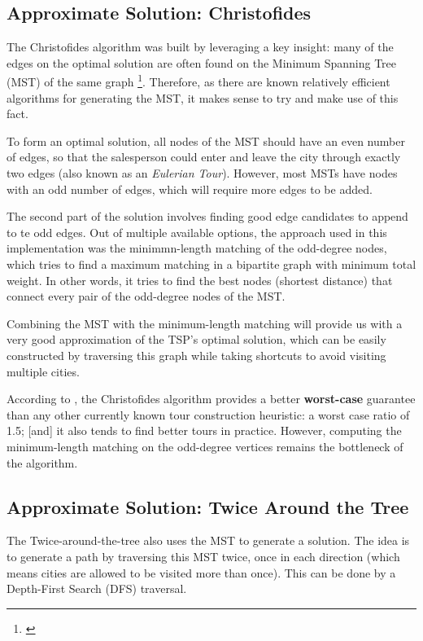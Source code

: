 \documentclass[12pt]{article}
\begin{document}
\subsection{Approximate Solution: Christofides} \label{sec:chris_explanation}

The Christofides algorithm was built by leveraging a key insight: many of the edges on the 
optimal solution are often found on the Minimum Spanning Tree (MST) of the same graph 
\footnote{\cite{reducible_explanation}}. Therefore, as there are known relatively efficient 
algorithms for generating the MST, it makes sense to try and make use of this fact.

To form an optimal solution, all nodes of the MST should have an even number of edges, so 
that the salesperson could enter and leave the city through exactly two edges (also known as an 
\textit{Eulerian Tour}). However, most MSTs have nodes with an odd number of edges, 
which will require more edges to be added.

The second part of the solution involves finding good edge candidates to append to te odd 
edges. Out of multiple available options, the approach used in this implementation was the minimmn-length
matching of the odd-degree nodes, which tries to find a maximum matching in a bipartite 
graph with minimum total weight. In other words, it tries to find the best nodes (shortest distance) 
that connect every pair of the odd-degree nodes of the MST.

Combining the MST with the minimum-length matching will provide us with a very good 
approximation of the TSP's optimal solution, which can be easily constructed by
traversing this graph while taking shortcuts to avoid visiting multiple cities.

According to \cite{Johnson2003}, the Christofides algorithm provides a better 
\textbf{worst-case} guarantee than any other currently known tour construction heuristic: a worst case ratio of 1.5; 
[and] it also tends to find better tours in practice. However, computing the minimum-length 
matching on the odd-degree vertices remains the bottleneck of the algorithm.

\subsection{Approximate Solution: Twice Around the Tree} \label{sec:twice_explanation}

The Twice-around-the-tree also uses the MST to generate a solution. The idea is to generate a path by 
traversing this MST twice, once in each direction (which means cities are allowed to be visited 
more than once). This can be done by a Depth-First Search (DFS) traversal.
\end{document}
